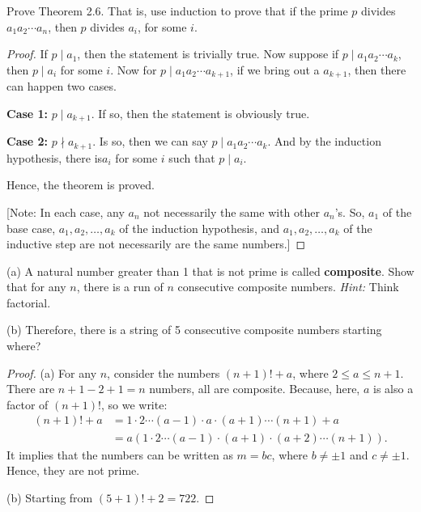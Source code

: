 \documentclass[12pt]{article}
\newenvironment{exercise}[2][Exercise]{\begin{trivlist}
\item[\hskip \labelsep {\bfseries #1}\hskip \labelsep {\bfseries #2.}]}{\end{trivlist}}
\begin{document}
\begin{exercise}{5}
Prove Theorem 2.6. That is, use induction to prove that if the prime \(p\) divides \(a_1 a_2 \cdots a_n\), then \(p\) divides \(a_i\), for some \(i\).
\end{exercise}

\begin{proof}
If $p\mid a_1$, then the statement is trivially true. Now suppose if $p\mid a_1 a_2 \cdots a_k$, then $p\mid a_i$ for some $i$. Now for $p\mid a_1 a_2 \cdots a_{k+1}$, if we bring out a $a_{k+1}$, then there can happen two cases.

\textbf{Case 1:} $p\mid a_{k+1}$. If so, then the statement is obviously true.

\textbf{Case 2:} $p\nmid a_{k+1}$. Is so, then we can say $p\mid a_1 a_2 \cdots a_k$. And by the induction hypothesis, there is$a_i$ for some $i$ such that $p\mid a_i$.

Hence, the theorem is proved.

[Note: In each case, any $a_n$ not necessarily the same with other $a_n$'s. So, $a_1$ of the base case, $a_1, a_2, \ldots ,a_k$ of the induction hypothesis, and $a_1, a_2, \ldots ,a_k$ of the inductive step are not necessarily are the same numbers.]
\end{proof}

\begin{exercise}{7}
(a) A natural number greater than 1 that is not prime is called \textbf{composite}. Show that for any \( n \), there is a run of \( n \) consecutive composite numbers. \textit{Hint:} Think factorial.

(b) Therefore, there is a string of 5 consecutive composite numbers starting where?
\end{exercise}

\begin{proof}
(a) For any $n$, consider the numbers $(n+1)!+a$, where $2\leq a \leq n+1$. There are $n+1-2+1=n$ numbers, all are composite. Because, here, $a$ is also a factor of $(n+1)!$, so we write:
\begin{align*}
(n+1)!+a & = 1\cdot 2\cdots (a-1)\cdot a\cdot (a+1) \cdots (n+1) + a \\
& = a(1\cdot 2\cdots (a-1) \cdot (a+1)\cdot (a+2)\cdots (n+1)).
\end{align*}
It implies that the numbers can be written as $m=bc$, where $b\neq \pm 1$ and $c\neq \pm 1$. Hence, they are not prime.

(b) Starting from $(5+1)!+2=722$.
\end{proof}
\end{document}

